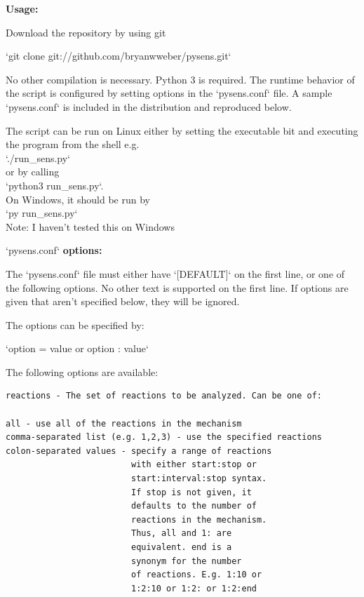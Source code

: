 \documentclass[12pt,letterpaper,oneside,draft]{book}
\begin{document}
\begin{appendices}
\begin{singlespace}
{\blankline

{\large \textbf{Usage:}}

Download the repository by using git

`git clone git://github.com/bryanwweber/pysens.git`

No other compilation is necessary. Python 3 is required.
The runtime behavior of the script is configured by setting options in
the `pysens.conf` file. A sample `pysens.conf` is included in the
distribution and reproduced below.

The script can be run on Linux either by setting the executable bit
and executing the program from the shell e.g.\\
`./run_sens.py`\\
or by calling\\
`python3 run_sens.py`.\\
On Windows, it should be run by\\
`py run_sens.py`\\
Note: I haven't tested this on Windows

\blankline

{\large `pysens.conf` \textbf{options:}}

The `pysens.conf` file must either have `[DEFAULT]` on the first line,
or one of the following options. No other text is supported on the first
line. If options are given that aren't specified below, they will be
ignored.

The options can be specified by:

`option = value or option : value`

The following options are available:

\begin{Verbatim}
reactions - The set of reactions to be analyzed. Can be one of:

all - use all of the reactions in the mechanism
comma-separated list (e.g. 1,2,3) - use the specified reactions
colon-separated values - specify a range of reactions
                         with either start:stop or
                         start:interval:stop syntax.
                         If stop is not given, it
                         defaults to the number of
                         reactions in the mechanism.
                         Thus, all and 1: are
                         equivalent. end is a
                         synonym for the number
                         of reactions. E.g. 1:10 or
                         1:2:10 or 1:2: or 1:2:end


\end{Verbatim}}
\end{singlespace}
\end{appendices}
\end{document}
